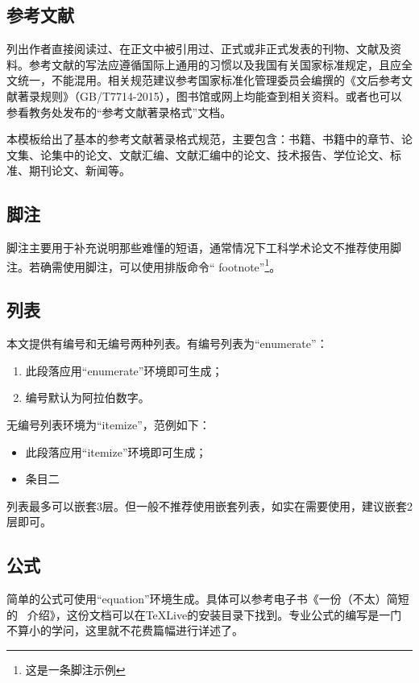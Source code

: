 \documentclass{Diploma}
\begin{document}
\subsection{参考文献}
列出作者直接阅读过、在正文中被引用过、正式或非正式发表的刊物、文献及资料。参考文献的写法应遵循国际上通用的习惯以及我国有关国家标准规定，且应全文统一，不能混用。相关规范建议参考国家标准化管理委员会编撰的《文后参考文献著录规则》（GB/T7714-2015）\cite{gbt7714-2015}，图书馆或网上均能查到相关资料。或者也可以参看教务处发布的“参考文献著录格式”文档。

本模板给出了基本的参考文献著录格式规范，主要包含：书籍、书籍中的章节、论文集、论集中的论文、文献汇编、文献汇编中的论文、技术报告、学位论文、标准、期刊论文、新闻等。

\clearpage\subsection{脚注}
脚注主要用于补充说明那些难懂的短语，通常情况下工科学术论文不推荐使用脚注。若确需使用脚注，可以使用排版命令“ footnote”\footnote{这是一条脚注示例}。

\subsection{列表}
本文提供有编号和无编号两种列表。有编号列表为“enumerate”：
\begin{enumerate}
  \item 此段落应用“enumerate”环境即可生成；
  \item 编号默认为阿拉伯数字。
\end{enumerate}
无编号列表环境为“itemize”，范例如下：
\begin{itemize}
  \item 此段落应用“itemize”环境即可生成；
  \item 条目二
\end{itemize}

列表最多可以嵌套3层。但一般不推荐使用嵌套列表，如实在需要使用，建议嵌套2层即可。

\subsection{公式}
简单的公式可使用“equation”环境生成。具体可以参考电子书《一份（不太）简短的 \LaTeXe\ 介绍》\cite{lshort}，这份文档可以在TeXLive的安装目录下找到。专业公式的编写是一门不算小的学问，这里就不花费篇幅进行详述了。
\end{document}
